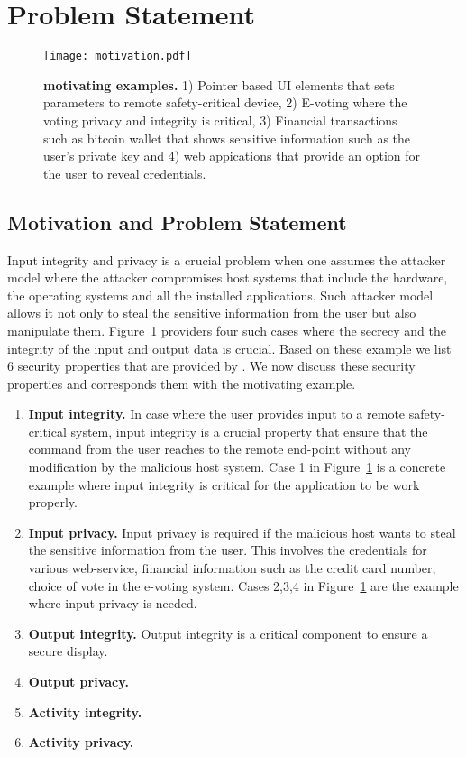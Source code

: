 \section{Problem Statement}
\label{sec:problemStatement}

\begin{figure}[t]
\centering
\texttt{[image: motivation.pdf]}
\caption{\textbf{\name motivating examples.} 1) Pointer based UI elements that sets parameters to remote safety-critical device, 2) E-voting where the voting privacy and integrity is critical, 3) Financial transactions such as bitcoin wallet that shows sensitive information such as the user's private key and 4) web appications that provide an option for the user to reveal credentials.}
\label{fig:motivation}
\centering
\end{figure}


\subsection{Motivation and Problem Statement}
Input integrity and privacy is a crucial problem when one assumes the attacker model where the attacker compromises host systems that include the hardware, the operating systems and all the installed applications. Such attacker model allows it not only to steal the sensitive information from the user but also manipulate them. Figure~\ref{fig:motivation} providers four such cases where the secrecy and the integrity of the input and output data is crucial. Based on these example we list 6 security properties that are provided by \name. We now discuss these security properties and corresponds them with the motivating example.

\begin{enumerate}
  \item \textbf{Input integrity.} In case where the user provides input to a remote safety-critical system, input integrity is a crucial property that ensure that the command from the user reaches to the remote end-point without any modification by the malicious host system. Case 1 in Figure~\ref{fig:motivation} is a concrete example where input integrity is critical for the application to be work properly.
  \item \textbf{Input privacy.}  Input privacy is required if the malicious host wants to steal the sensitive information from the user. This involves the credentials for various web-service, financial information such as the credit card number, choice of vote in the e-voting system. Cases 2,3,4 in Figure~\ref{fig:motivation} are the example where input privacy is needed.
  \item \textbf{Output integrity.} Output integrity is a critical component to ensure a secure display.
  \item \textbf{Output privacy.}
  \item \textbf{Activity integrity.}
  \item \textbf{Activity privacy.}
\end{enumerate}


